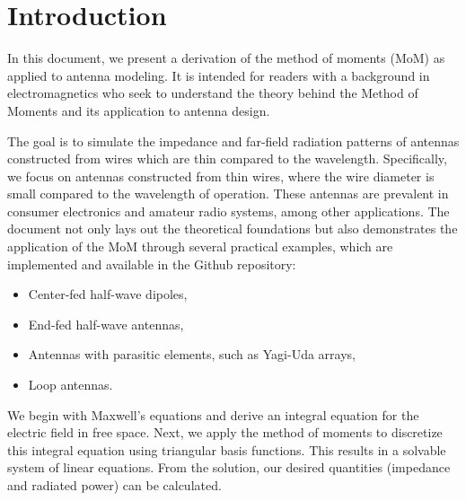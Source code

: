 \clearpage
\section{Introduction}
In this document, we present a derivation of the method of moments (MoM) as applied to antenna modeling. It is intended for readers with a background in electromagnetics who seek to understand the theory behind the Method of Moments and its application to antenna design.

The goal is to simulate the impedance and far-field radiation patterns of antennas constructed from wires which are thin compared to the wavelength. Specifically, we focus on antennas constructed from thin wires, where the wire diameter is small compared to the wavelength of operation. These antennas are prevalent in consumer electronics and amateur radio systems, among other applications. The document not only lays out the theoretical foundations but also demonstrates the application of the MoM through several practical examples, which are implemented and available in the Github repository:
\begin{itemize}
	\item Center-fed half-wave dipoles,
	\item End-fed half-wave antennas,
	\item Antennas with parasitic elements, such as Yagi-Uda arrays,
	\item Loop antennas.
\end{itemize}

We begin with Maxwell's equations and derive an integral equation for the electric field in free space. Next, we apply the method of moments to discretize this integral equation using triangular basis functions. This results in a solvable system of linear equations. From the solution, our desired quantities (impedance and radiated power) can be calculated.